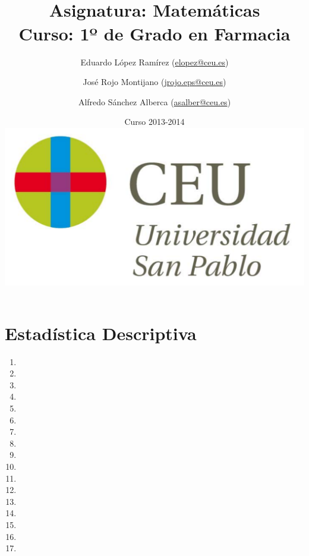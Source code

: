 \documentclass[a4paper,titlepage,dvips]{article}
\begin{document}
\sloppy

\title{\vskip 2cm
\shadowbox{\Huge \textbf{\textsf{\quad \textcolor[rgb]{0.00,0.00,0.50}{EJERCICIOS DE ESTADÍSTICA}\quad}}}\\
   \vskip 1cm
   {\Large \textsf{\textcolor[rgb]{0.50,0.00,0.25}{Asignatura: Matemáticas }}}\\
   {\Large \textsf{\textcolor[rgb]{0.50,0.00,0.25}{Curso: 1º de Grado en Farmacia}}}
   }
\author{
   Eduardo López Ramírez (\url{elopez@ceu.es})
   \and
   José Rojo Montijano (\url{jrojo.eps@ceu.es})
   \and
   Alfredo Sánchez Alberca (\url{asalber@ceu.es})
}
\date{Curso 2013-2014\\[1cm]
\includegraphics[scale=0.3]{img/logo_uspceu_01}}

\maketitle
\newpage
\tableofcontents
\newpage








\section{Estadística Descriptiva}
\begin{enumerate}[leftmargin=*]
\item {}
\item {}
\item {}
\item {}
\item {}
\item {}
\item {}
\item {}
\item {}
\item {}
\item {}
\item {}
\item {}
\item {}
\item {}
\item {}
\item {}
\end{enumerate}
\end{document}
